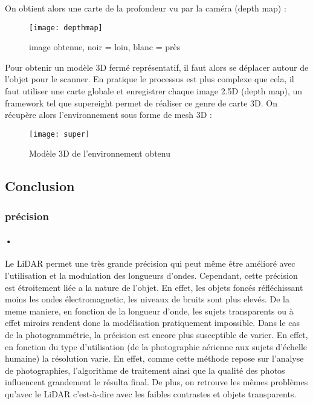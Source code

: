 On obtient alors une carte de la profondeur vu par la caméra (depth map) :

\begin{figure}[h]
    \centering
    \texttt{[image: depthmap]}
    \caption{image obtenue, noir = loin, blanc = près}
    \label{fig:pifuhdWork3}
\end{figure}
\FloatBarrier

Pour obtenir un modèle 3D fermé représentatif, il faut alors se déplacer autour de l'objet pour le scanner. En pratique le processus est plus complexe que cela, il faut utiliser une carte globale et enregistrer chaque image 2.5D (depth map), un framework tel que supereight \cite{super} permet de réaliser ce genre de carte 3D.
On récupère alors l'environnement sous forme de mesh 3D :

\begin{figure}[h]
    \centering
    \texttt{[image: super]}
    \caption{Modèle 3D de l'environnement obtenu}
    \label{fig:super}
\end{figure}
\FloatBarrier


\subsection{Conclusion}


\subsubsection{précision}
\paragraph{•} Le LiDAR permet une très grande précision qui peut même être amélioré avec l'utilisation et la modulation des longueurs d'ondes. Cependant, cette précision est étroitement liée a la nature de l'objet. En effet, les objets foncés réfléchissant moins les ondes électromagnetic, les niveaux de bruits sont plus elevés. De la meme maniere, en fonction de la longueur d'onde, les sujets transparents ou à effet miroirs rendent donc la modélisation pratiquement impossible.
Dans le cas de la photogrammétrie, la précision est encore plus susceptible de varier. En effet, en fonction du type d'utilisation (de la photographie aérienne aux sujets d'échelle humaine) la résolution varie. En effet, comme cette méthode repose sur l'analyse de photographies, l'algorithme de traitement ainsi que la qualité des photos influencent grandement le résulta final. De plus, on retrouve les mêmes problèmes qu'avec le LiDAR c'est-à-dire avec les faibles contrastes et objets transparents.

